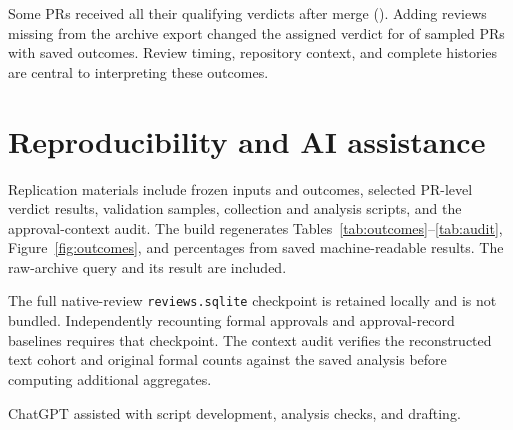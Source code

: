\documentclass[11pt,letterpaper]{article}
\begin{document}
Some PRs received all their qualifying verdicts after merge
(\PostMergeRate{}). Adding reviews missing from the archive export
changed the assigned verdict for \AuditGroupChangeRate{} of sampled PRs
with saved outcomes. Review timing, repository context, and complete
histories are central to interpreting these outcomes.

\section{Reproducibility and AI assistance}

Replication materials include frozen inputs and outcomes, selected PR-level
verdict results, validation samples, collection and analysis
scripts, and the approval-context audit. The build regenerates
Tables~\ref{tab:outcomes}--\ref{tab:audit}, Figure~\ref{fig:outcomes}, and
percentages from saved machine-readable results. The raw-archive query
and its result are included.

The full native-review \texttt{reviews.sqlite} checkpoint is retained
locally and is not bundled. Independently recounting formal approvals
and approval-record baselines requires that checkpoint. The context audit
verifies the reconstructed text cohort and original formal counts against
the saved analysis before computing additional aggregates.
\RepositoryLink{}

ChatGPT assisted with script development, analysis checks, and drafting.
\end{document}

